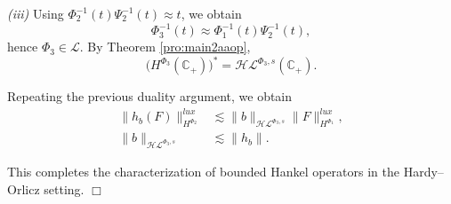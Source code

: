 \documentclass[a4paper,12pt,intlimits,oneside]{amsart}
\theoremstyle{definition}
\numberwithin{equation}{section}
\newcommand{\epf}{ $\Box$\medskip}
\theoremstyle{definition}
\begin{document}
\medskip

\textit{(iii)} 
Using $\Phi_{2}^{-1}(t)\Psi_{2}^{-1}(t)\approx t$, we obtain
\[
\Phi_{3}^{-1}(t)\approx \Phi_{1}^{-1}(t)\Psi_{2}^{-1}(t),
\]
hence $\Phi_{3}\in \mathscr{L}$. By Theorem \ref{pro:main2aaop},
\[
\big(H^{\Phi_{3}}(\mathbb{C}_{+})\big)^{*}
=\mathcal{H}\mathcal{L}^{\Phi_{3},s}(\mathbb{C}_{+}).
\]

Repeating the previous duality argument, we obtain
\begin{align}
\|h_{b}(F)\|_{H^{\Phi_{2}}}^{lux}
&\lesssim \|b\|_{\mathcal{H}\mathcal{L}^{\Phi_{3},s}}
\|F\|_{H^{\Phi_{1}}}^{lux}, \label{eq:ineitedPay}\\
\|b\|_{\mathcal{H}\mathcal{L}^{\Phi_{3},s}}
&\lesssim \|h_{b}\|. \label{eq:ineitahay}
\end{align}

\medskip

\noindent
This completes the characterization of bounded Hankel operators in the Hardy--Orlicz setting.
\epf
\end{document}

